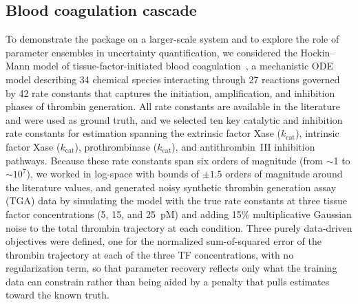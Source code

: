\documentclass[preprint,review,12pt]{elsarticle}
\begin{document}
\subsection{Blood coagulation cascade}\label{sec:coag}
To demonstrate the package on a larger-scale system and to explore the role of parameter ensembles in uncertainty quantification, we considered the Hockin--Mann model of tissue-factor-initiated blood coagulation~\cite{HockinMann2002}, a mechanistic ODE model describing 34 chemical species interacting through 27 reactions governed by 42 rate constants that captures the initiation, amplification, and inhibition phases of thrombin generation.
All rate constants are available in the literature and were used as ground truth, and we selected ten key catalytic and inhibition rate constants for estimation spanning the extrinsic factor Xase ($k_{\text{cat}}$), intrinsic factor Xase ($k_{\text{cat}}$), prothrombinase ($k_{\text{cat}}$), and antithrombin~III inhibition pathways.
Because these rate constants span six orders of magnitude (from $\sim$1 to $\sim 10^7$), we worked in log-space with bounds of $\pm 1.5$ orders of magnitude around the literature values, and generated noisy synthetic thrombin generation assay (TGA) data by simulating the model with the true rate constants at three tissue factor concentrations (5, 15, and 25~pM) and adding 15\% multiplicative Gaussian noise to the total thrombin trajectory at each condition.
Three purely data-driven objectives were defined, one for the normalized sum-of-squared error of the thrombin trajectory at each of the three TF concentrations, with no regularization term, so that parameter recovery reflects only what the training data can constrain rather than being aided by a penalty that pulls estimates toward the known truth.
\end{document}
